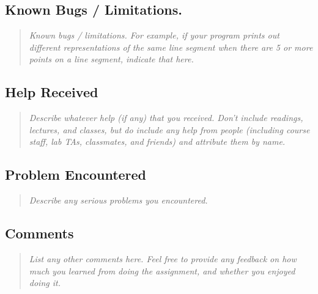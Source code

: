 \documentclass[11pt,a4paper,notitlepage]{article}
\newcommand{\explanation}[1]{\begin{quote}\emph{#1} \end{quote}}  %
\begin{document}
\subsection{Known Bugs / Limitations.}
\explanation{Known bugs / limitations. For example, if your program prints
  out different representations of the same line segment when there
 are 5 or more points on a line segment, indicate that here.}

\subsection{Help Received}
\explanation{
Describe whatever help (if any) that you received.
Don't include readings, lectures, and classes, but do
include any help from people (including course staff, lab TAs,
classmates, and friends) and attribute them by name.}


\subsection{Problem Encountered}
\explanation{
Describe any serious problems you encountered.                    }



\subsection{Comments}
\explanation{
List any other comments here. Feel free to provide any feedback   
on how much you learned from doing the assignment, and whether    
you enjoyed doing it.}
\end{document}
